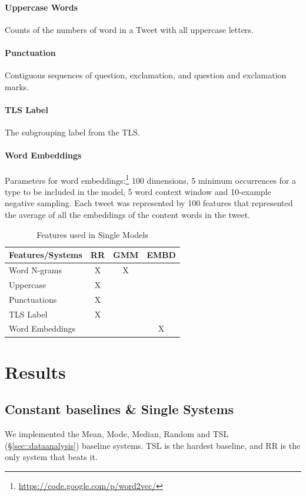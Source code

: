\documentclass[11pt,letterpaper]{article}
\begin{document}
\paragraph{Uppercase Words} Counts of the numbers of word in a Tweet with all uppercase letters.

\paragraph{Punctuation} Contiguous sequences of question, exclamation, and question and exclamation marks.

\paragraph{TLS Label} The subgrouping label from the TLS.

\paragraph{Word Embeddings}
Parameters for word embeddings:\footnote{\url{https://code.google.com/p/word2vec/}} 100 dimensions, 5 minimum occurrences for a type to be included in the model, 5 word context window and 10-example negative sampling. Each tweet was represented by 100 features that represented the average of all the embeddings of the content words in the tweet. %
\begin{table}[ht!]\centering

\begin{tabular}{l || c c c}
Features/Systems & {\sc RR} & GMM  &EMBD \\
\hline
Word N-grams & X & X & \\
Uppercase & X& \\
Punctuations &X  & \\
TLS Label & X &\\
Word Embeddings & & &X\\
\end{tabular}
\caption{Features used in Single Models}
\label{tbl:featuresTable}
\end{table}

\section{Results}

\subsection{Constant baselines \& Single Systems}\label{sec:baselineResults}
We implemented the Mean, Mode, Median, Random and TSL (\S\ref{sec::dataanalysis}) baseline systems. TSL is the hardest baseline, and {\sc RR} is the only system that beats it.
\end{document}
